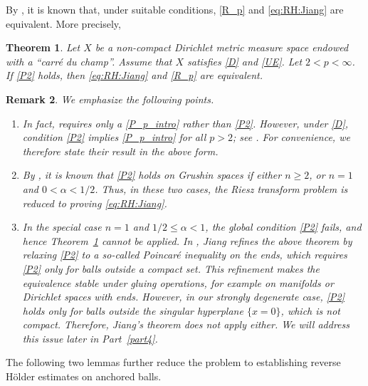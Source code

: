 \documentclass[12pt]{amsart}
\newtheorem{theorem}{Theorem}[section]
\newtheorem{remark}[theorem]{Remark}
\begin{document}
By \cite{CJKS}, it is known that, under suitable conditions, \eqref{R_p} and \eqref{eq:RH:Jiang} are equivalent. More precisely,

\begin{theorem}\cite[Theorem~1.9]{CJKS}\label{thm:CJKS}
Let $X$ be a non-compact Dirichlet metric measure space endowed with a ``carr\'e du champ''. Assume that $X$ satisfies \eqref{D} and \eqref{UE}. Let $2<p<\infty$. If \eqref{P2} holds, then \eqref{eq:RH:Jiang} and \eqref{R_p} are equivalent.
\end{theorem}






\begin{remark}
We emphasize the following points.
\begin{enumerate}[label=(\roman*)]
\item In fact, \cite[Theorem~1.9]{CJKS} requires only a \eqref{P_p_intro} rather than \eqref{P2}. However, under \eqref{D}, condition \eqref{P2} implies \eqref{P_p_intro} for all $p>2$; see \cite{HK}. For convenience, we therefore state their result in the above form.

\item By \cite[Theorem~1.1]{RS2}, it is known that \eqref{P2} holds on Grushin spaces if either $n\ge 2$, or $n=1$ and $0<\alpha<1/2$. Thus, in these two cases, the Riesz transform problem is reduced to proving \eqref{eq:RH:Jiang}.
\item In the special case $n=1$ and $1/2\le \alpha<1$, the global condition \eqref{P2} fails, and hence Theorem~\ref{thm:CJKS} cannot be applied. In \cite{Jiang}, Jiang refines the above theorem by relaxing \eqref{P2} to a so-called Poincar\'e inequality on the ends, which requires \eqref{P2} only for balls outside a compact set. This refinement makes the equivalence stable under gluing operations, for example on manifolds or Dirichlet spaces with ends. However, in our strongly degenerate case, \eqref{P2} holds only for balls outside the singular hyperplane $\{x=0\}$, which is not compact. Therefore, Jiang's theorem does not apply either. We will address this issue later in Part~\ref{part4}.

\end{enumerate}
\end{remark}





The following two lemmas further reduce the problem to establishing reverse H\"older estimates on anchored balls.
\end{document}
